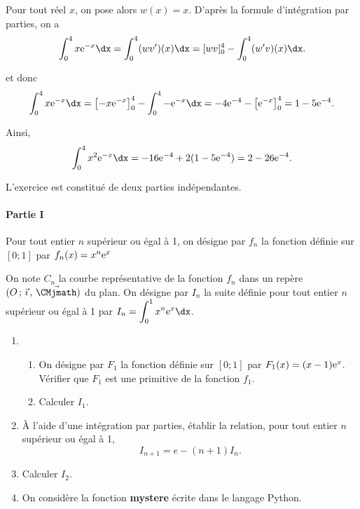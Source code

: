 \documentclass[11pt,fleqn, openany]{book} %
\begin{document}
\begin{solution}
\begin{enumerate}
	Pour tout réel \(x\), on pose alors \(w(x) =x\). D'après la formule d'intégration par parties, on a
\[ \displaystyle \int _0^4 x\e^{-x}\dx = \displaystyle \int _0^4 (wv')(x)\dx = [wv]_0^4 - \displaystyle \int _0^4 (w'v)(x)\dx.\]

	et donc 
\[ \displaystyle \int _0^4 x\e^{-x}\dx = \left[-x\e^{-x}\right]_0^4 - \displaystyle \int _0^4 -\e^{-x}\dx = -4\e^{-4} - \left[\e^{-x}\right]_0^4 = 1-5\e^{-4}.\]

	Ainsi, 
\[ \displaystyle \int _0^4 x^2\e^{-x}\dx = -16\e^{-4}+2(1-5\e^{-4})=2-26\e^{-4}.\]
\end{enumerate}
\end{solution}







\begin{exercise}[subtitle={(Sujet zéro 2024)}]

L'exercice est constitué de deux parties indépendantes.

\paragraph{Partie I}

Pour tout entier $n$ supérieur ou égal à 1, on désigne par $f_n$ la fonction définie sur $[0;1]$ par $f_n(x)=x^n\mathrm{e}^x$

On note $C_n$ la courbe représentative de la fonction $f_n$ dans un repère $\Oij$ du plan. On désigne par $I_n$ la suite définie pour tout entier $n$ supérieur ou égal à 1 par $I_n=\displaystyle\int_0^1x^n\e^x\dx$.

\begin{enumerate}
\item \begin{enumerate} 
\item On désigne par $F_1$ la fonction définie sur $[0;1]$ par $F_1(x)=(x-1)\mathrm{e}^x$.\\ Vérifier que $F_1$ est une primitive de la fonction $f_1$.
\item Calculer $I_1$.
\end{enumerate}
\item À l'aide d'une intégration par parties, établir la relation, pour tout entier $n$ supérieur ou égal à 1, \[I_{n+1}=e-(n+1)I_n.\]
\item Calculer $I_2$.
\item On considère la fonction \textbf{mystere} écrite dans le langage Python.


\end{enumerate}
\end{exercise}
\end{document}
